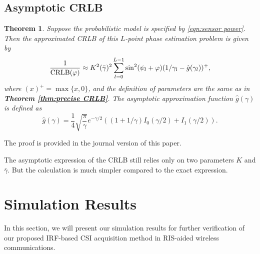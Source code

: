 \documentclass[conference,10pt,twocolumn]{IEEEtran}
\newtheorem{theorem}{\bf Theorem}
\theoremstyle{nonumberplain}
\begin{document}
\subsection{Asymptotic CRLB}    \label{Asymptotic CRLB}
    \begin{theorem}\label{thm:asymptotic CRLB}
        Suppose the probabilistic model is specified by \eqref{eqn:sensor power}. Then the approximated CRLB of this $L$-point phase estimation problem is given by 
        \begin{equation}
            \frac{1}{{\rm CRLB}(\varphi)}\approx K^2(\bar{\gamma})^2 \sum_{l=0}^{L-1}\sin^2(\psi_l+\varphi)(1/\gamma_l-\hat{g}(\gamma_l))^{+},
            \label{eqn:asymptotic CRLB}
        \end{equation}
        where $(x)^{+}=\max \{x,0\}$, and the definition of parameters are the same as in {\bf Theorem \ref{thm:precise CRLB}}. The asymptotic approximation function $\hat{g}(\gamma)$ is defined as 
        \begin{equation}
            \hat{g}(\gamma) = \frac{1}{4} \sqrt{\frac{\pi}{\gamma}}e^{-\gamma/2}\left((1+1/\gamma)I_0(\gamma/2) + I_1(\gamma/2)\right).
            \label{eqn:definition g function}
        \end{equation}
    \end{theorem}
    \begin{IEEEproof}
        The proof is provided in the journal version of this paper. 
    \end{IEEEproof}
    
    The asymptotic expression of the CRLB still relies only on two parameters $K$ and $\bar{\gamma}$. But the calculation is much simpler compared to the exact expression. 


\section{Simulation Results}
\label{Simulation Results}
In this section, we will present our simulation results for further verification of our proposed \ac{IRF}-based CSI acquisition method in RIS-aided wireless communications.
\end{document}
